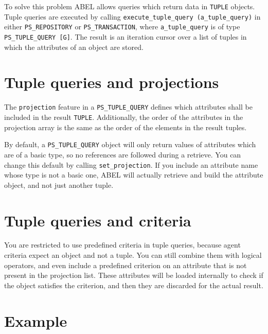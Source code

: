 \documentclass[a4paper,12pt]{report}
\begin{document}
To solve this problem ABEL allows queries which return data in \lstinline!TUPLE! objects.
Tuple queries are executed by calling  \lstinline!execute_tuple_query (a_tuple_query)! in either \lstinline!PS_REPOSITORY! or \lstinline!PS_TRANSACTION!, 
where \lstinline!a_tuple_query! is of type \lstinline!PS_TUPLE_QUERY [G]!.
The result is an iteration cursor over a list of tuples in which the attributes of an object are stored.

\section{Tuple queries and projections}
The \lstinline!projection! feature in a \lstinline!PS_TUPLE_QUERY! defines which attributes shall be included in the result \lstinline!TUPLE!. 
Additionally, the order of the attributes in the projection array is the same as the order of the elements in the result tuples.

By default, a \lstinline!PS_TUPLE_QUERY! object will only return values of attributes which are of a basic type, so no references are followed during a retrieve.
You can change this default by calling \lstinline{set_projection}.
If you include an attribute name whose type is not a basic one, ABEL will actually retrieve and build the attribute object, and not just another tuple.

\section{Tuple queries and criteria}
You are restricted to use predefined criteria in tuple queries, because agent criteria expect an object and not a tuple. 
You can still combine them with logical operators, and even include a predefined criterion on an attribute that is not present in the projection list.
These attributes will be loaded internally to check if the object satisfies the criterion, and then they are discarded for the actual result.

\section {Example}
\end{document}
